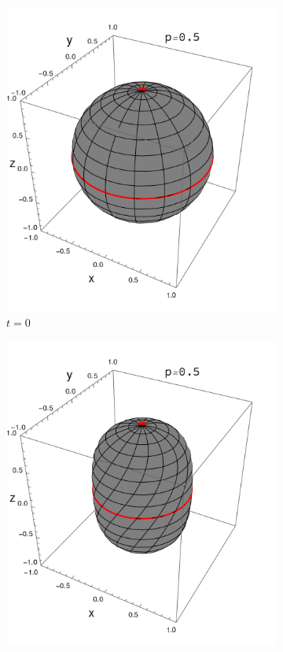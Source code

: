 \begin{figure}[ht!]
    \centering
    \begin{subfigure}{0.32\textwidth}
      \centering
      \includegraphics[width=0.9\linewidth]{chapter3/figures_special/sphere_Ising_t=0._z=0.9_p=0.5.png}
      \caption{$t=0$}
    \end{subfigure}%
    \begin{subfigure}{0.32\textwidth}
      \centering
      \includegraphics[width=0.9\linewidth]{chapter3/figures_special/sphere_Ising_t=0.5_z=0.9_p=0.5.png}

\end{subfigure}
\end{figure}
